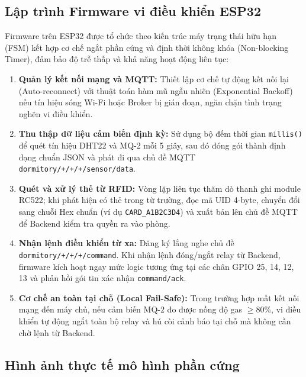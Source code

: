 \subsection{Lập trình Firmware vi điều khiển ESP32}
Firmware trên ESP32 được tổ chức theo kiến trúc máy trạng thái hữu hạn (FSM) kết hợp cơ chế ngắt phần cứng và định thời không khóa (Non-blocking Timer), đảm bảo độ trễ thấp và khả năng hoạt động liên tục:
\begin{enumerate}
    \item \textbf{Quản lý kết nối mạng và MQTT:} Thiết lập cơ chế tự động kết nối lại (Auto-reconnect) với thuật toán hàm mũ ngẫu nhiên (Exponential Backoff) nếu tín hiệu sóng Wi-Fi hoặc Broker bị gián đoạn, ngăn chặn tình trạng nghẽn vi điều khiển.
    \item \textbf{Thu thập dữ liệu cảm biến định kỳ:} Sử dụng bộ đếm thời gian \texttt{millis()} để quét tín hiệu DHT22 và MQ-2 mỗi 5 giây, sau đó đóng gói thành định dạng chuẩn JSON và phát đi qua chủ đề MQTT \texttt{dormitory/+/+/+/sensor/data}.
    \item \textbf{Quét và xử lý thẻ từ RFID:} Vòng lặp liên tục thăm dò thanh ghi module RC522; khi phát hiện có thẻ trong từ trường, đọc mã UID 4-byte, chuyển đổi sang chuỗi Hex chuẩn (ví dụ \texttt{CARD\_A1B2C3D4}) và xuất bản lên chủ đề MQTT để Backend kiểm tra quyền ra vào phòng.
    \item \textbf{Nhận lệnh điều khiển từ xa:} Đăng ký lắng nghe chủ đề \texttt{dormitory/+/+/+/command}. Khi nhận lệnh đóng/ngắt relay từ Backend, firmware kích hoạt ngay mức logic tương ứng tại các chân GPIO 25, 14, 12, 13 và phản hồi gói tin xác nhận \texttt{command/ack}.
    \item \textbf{Cơ chế an toàn tại chỗ (Local Fail-Safe):} Trong trường hợp mất kết nối mạng đến máy chủ, nếu cảm biến MQ-2 đo được nồng độ gas $\ge 80\%$, vi điều khiển tự động ngắt toàn bộ relay và hú còi cảnh báo tại chỗ mà không cần chờ lệnh từ Backend.
\end{enumerate}

\subsection{Hình ảnh thực tế mô hình phần cứng}

